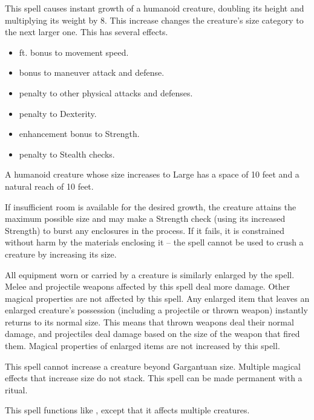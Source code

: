 \spelldur{\durshort \dismissable}
\spelleffect This spell causes instant growth of a humanoid creature, doubling its height and multiplying its weight by 8. This increase changes the creature's size category to the next larger one. This has several effects.
\begin{itemize} 
    \item {} ft. bonus to movement speed.
    \item {} bonus to maneuver attack and defense.
    \item {} penalty to other physical attacks and defenses.
    \item {} penalty to Dexterity.
    \item {} enhancement bonus to Strength.
    \item {} penalty to Stealth checks.
\end{itemize}
\par A humanoid creature whose size increases to Large has a space of 10 feet and a natural reach of 10 feet.
\par If insufficient room is available for the desired growth, the creature attains the maximum possible size and may make a Strength check (using its increased Strength) to burst any enclosures in the process. If it fails, it is constrained without harm by the materials enclosing it -- the spell cannot be used to crush a creature by increasing its size.
\par All equipment worn or carried by a creature is similarly enlarged by the spell. Melee and projectile weapons affected by this spell deal more damage. Other magical properties are not affected by this spell. Any enlarged item that leaves an enlarged creature's possession (including a projectile or thrown weapon) instantly returns to its normal size. This means that thrown weapons deal their normal damage, and projectiles deal damage based on the size of the weapon that fired them. Magical properties of enlarged items are not increased by this spell.
\par This spell cannot increase a creature beyond Gargantuan size.
\spellnotes Multiple magical effects that increase size do not stack. This spell can be made permanent with a  ritual.

\spelleffect This spell functions like , except that it affects multiple creatures.

